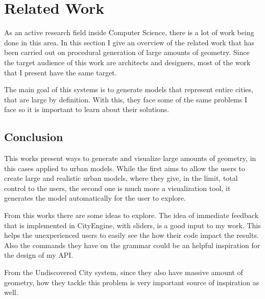
% 
% 

\section{Related Work}
\label{sec:related_work}

As an active research field inside Computer Science, there is a lot of work being done in this area. In this section I give an overview of the related work that has been carried out on procedural generation of large amounts of geometry. Since the target audience of this work are architects and designers, most of the work that I present have the same target.

The main goal of this systems is to generate models that represent entire cities, that are large by definition. With this, they face some of the same problems I face so it is important to learn about their solutions.






\subsection{Conclusion} %
\label{sub:conclusion}

This works present ways to generate and visualize large amounts of geometry, in this cases applied to urban models. While the first \cite{Parish2001} aims to allow the users to create large and realistic urban models, where they give, in the limit, total control to the users, the second one\cite{Greuter2003} is much more a visualization tool, it generates the model automatically for the user to explore.

From this works there are some ideas to explore. 
The idea of immediate feedback that is implemented in CityEngine, with sliders, is a good input to my work. This helps the unexperienced users to easily see the how their code impact the results. Also the commands they have on the grammar could be an helpful inspiration for the design of my API.

From the Undiscovered City system, since they also have massive amount of geometry, how they tackle this problem is very important source of inspiration as well. 


